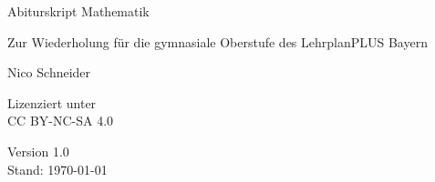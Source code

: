 \documentclass[ngerman, 12pt]{nssheetxea}
\begin{document}
\begin{titlepage}
   \begin{center}
       \vspace*{1.5cm}

       \begin{Huge}
       Abiturskript Mathematik
       \end{Huge}

       \vspace{0.5cm}
        \begin{large}
        Zur Wiederholung für die gymnasiale Oberstufe des LehrplanPLUS Bayern
        \end{large}

	   \vspace{3.0cm}
       \begin{large}
       Nico Schneider
       \end{large}
\end{center}

		
       \vfill
  \begin{center}          
       Lizenziert unter\\
       CC BY-NC-SA 4.0
            
       \vspace{0.8cm}
     
            

       Version 1.0\\
       Stand: \today
            
   \end{center}
\end{titlepage}
\thispagestyle{empty}
\newpage
\end{document}

